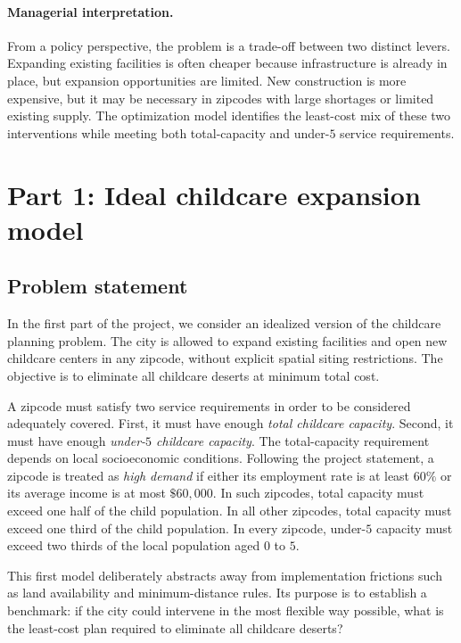 \documentclass[11pt]{article}
\newcommand{\1}{\mathbb{I}}
\begin{document}
\paragraph{Managerial interpretation.}
From a policy perspective, the problem is a trade-off between two distinct levers. Expanding existing facilities is often cheaper because infrastructure is already in place, but expansion opportunities are limited. New construction is more expensive, but it may be necessary in zipcodes with large shortages or limited existing supply. The optimization model identifies the least-cost mix of these two interventions while meeting both total-capacity and under-\(5\) service requirements.

\section{Part 1: Ideal childcare expansion model}

\subsection{Problem statement}

In the first part of the project, we consider an idealized version of the childcare planning problem. The city is allowed to expand existing facilities and open new childcare centers in any zipcode, without explicit spatial siting restrictions. The objective is to eliminate all childcare deserts at minimum total cost.

A zipcode must satisfy two service requirements in order to be considered adequately covered. First, it must have enough \emph{total childcare capacity}. Second, it must have enough \emph{under-\(5\) childcare capacity}. The total-capacity requirement depends on local socioeconomic conditions. Following the project statement, a zipcode is treated as \emph{high demand} if either its employment rate is at least \(60\%\) or its average income is at most \(\$60{,}000\). In such zipcodes, total capacity must exceed one half of the child population. In all other zipcodes, total capacity must exceed one third of the child population. In every zipcode, under-\(5\) capacity must exceed two thirds of the local population aged \(0\) to \(5\).

This first model deliberately abstracts away from implementation frictions such as land availability and minimum-distance rules. Its purpose is to establish a benchmark: if the city could intervene in the most flexible way possible, what is the least-cost plan required to eliminate all childcare deserts?
\end{document}
